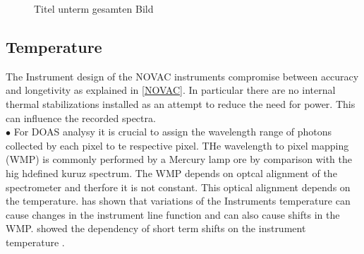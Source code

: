 \documentclass  [
  paper    = a4,
  BCOR     = 10mm,
  twoside,
  fontsize = 12pt,
  fleqn,
  toc      = bibnumbered,
  toc      = listofnumbered,
  numbers  = noendperiod,
  headings = normal,
  listof   = leveldown,
  version  = 3.03
]                                       {scrreprt}
\begin{document}
	\begin{figure}[h!]		
		\caption{Titel unterm gesamten Bild}
		\label{fig:shorttermshift}
	\end{figure}
	\subsection{Temperature}
	The Instrument design of the NOVAC instruments compromise between accuracy and longetivity as explained in \cref{NOVAC}. In particular there are no internal thermal stabilizations installed as an attempt to reduce the need for power. This can influence the recorded spectra.\\
	
	
	$\bullet$ For DOAS analysy it is crucial to assign the wavelength range of photons collected by each pixel to te respective pixel.
	THe wavelength to pixel mapping  (WMP) is commonly performed by a Mercury lamp ore by comparison with the hig hdefined kuruz spectrum. 
	The WMP depends on optcal alignment of the spectrometer and therfore it is not constant. This optical alignment depends on the temperature. 
	\cite{pinardi2007influence} has shown that variations of the Instruments temperature can cause changes in the instrument line function and can also cause shifts in the WMP.
	\cite{WarnachSimon} showed the dependency of short term shifts on the instrument temperature .\\
	
\end{document}
